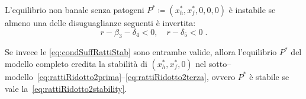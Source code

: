 \begin{proposizione}
L'equilibrio non banale senza patogeni $P^* \coloneq (x_h^*, x_f^*, 0,0,0)$ è instabile se almeno
una delle disuguaglianze seguenti è invertita:
\begin{equation}
    r - \beta_3 - \delta_4 < 0 , \quad
    r - \delta_5 < 0 \; .
\label{eq:condSuffRattiStab}
\end{equation}

Se invece le \eqref{eq:condSuffRattiStab} sono entrambe valide, allora l'equilibrio $P^*$
del modello completo eredita la stabilità di $(x_h^*, x_f^*, 0)$
nel sotto--modello~\eqref{eq:rattiRidotto2prima}--\eqref{eq:rattiRidotto2terza}, ovvero $P^*$ è stabile se vale la~\eqref{eq:rattiRidotto2stability}.
\end{proposizione}


